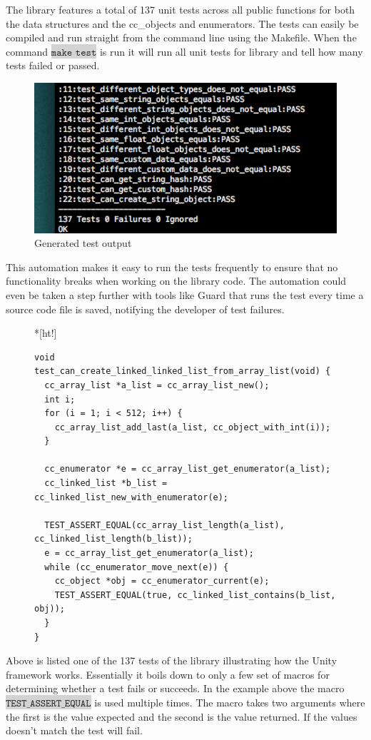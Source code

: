 \documentclass[table]{ituthesis}
\newcommand{\highlight}[1]{\colorbox{lightGray}{$\displaystyle \texttt{#1}$}}
\begin{document}
	The library features a total of 137 unit tests across all public functions for both the data structures and the cc\_objects and enumerators. The tests can easily be compiled and run straight from the command line using the Makefile. When the command \highlight{make test} is run it will run all unit tests for library and tell how many tests failed or passed.
	
	\begin{figure}[ht!]
		\begin{center}
			\includegraphics[scale=0.7]{images/test_output.png}
			\caption{Generated test output}
		\end{center}
		\label{fig:generate_test_output}
	\end{figure}
	
	This automation makes it easy to run the tests frequently to ensure that no functionality breaks when working on the library code. The automation could even be taken a step further with tools like Guard that runs the test every time a source code file is saved, notifying the developer of test failures.

\begin{figure}*[ht!]
\begin{lstlisting}[label=test-example,caption=Example of unit test with Unity]
void test_can_create_linked_linked_list_from_array_list(void) {
  cc_array_list *a_list = cc_array_list_new();
  int i;
  for (i = 1; i < 512; i++) {
    cc_array_list_add_last(a_list, cc_object_with_int(i));
  }

  cc_enumerator *e = cc_array_list_get_enumerator(a_list);
  cc_linked_list *b_list = cc_linked_list_new_with_enumerator(e);

  TEST_ASSERT_EQUAL(cc_array_list_length(a_list), cc_linked_list_length(b_list));
  e = cc_array_list_get_enumerator(a_list);
  while (cc_enumerator_move_next(e)) {
    cc_object *obj = cc_enumerator_current(e);
    TEST_ASSERT_EQUAL(true, cc_linked_list_contains(b_list, obj));
  }
}
\end{lstlisting}
\end{figure}
	Above is listed one of the 137 tests of the library illustrating how the Unity framework works. Essentially it boils down to only a few set of macros for determining whether a test fails or succeeds. In the example above the macro \highlight{TEST\_ASSERT\_EQUAL} is used multiple times. The macro takes two arguments where the first is the value expected and the second is the value returned. If the values doesn't match the test will fail.
\end{document}
